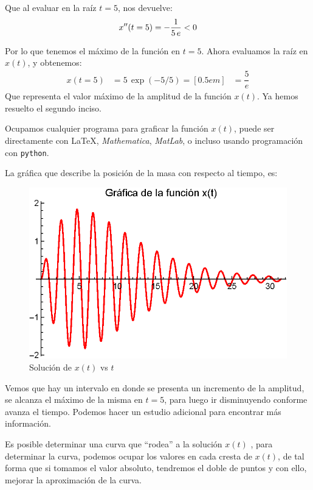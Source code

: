Que al evaluar en la raíz $t = 5$, nos devuelve: 
\begin{align*}
{x}^{\prime \prime}(t=5) = - \dfrac{1}{5 \, e} < 0
\end{align*}

Por lo que tenemos el máximo de la función en $t = 5$. Ahora evaluamos la raíz en $x(t)$, y obtenemos:
\begin{align*}
x(t=5) &= 5 \, \exp (-5/5) = [0.5em]
&= \dfrac{5}{e}
\end{align*}
Que representa el valor máximo de la amplitud de la función $x(t)$.  Ya hemos resuelto el segundo inciso.

Ocupamos cualquier programa para graficar la función $x(t)$, puede ser directamente con \LaTeX, \emph{Mathematica}, \emph{MatLab}, o incluso usando programación con \texttt{python}.

La gráfica que describe la posición de la masa con respecto al tiempo, es:
\begin{figure}
    \centering
    \includegraphics[scale=1]{Imagenes/Ejemplo_Resonancia_01.eps}
    \caption{Solución de $x(t)$ vs $t$}
\end{figure}

Vemos que hay un intervalo en donde se presenta un incremento de la amplitud, se alcanza el máximo de la misma en $t = 5$, para luego ir disminuyendo conforme avanza el tiempo. Podemos hacer un estudio adicional para encontrar más información.
\par
Es posible determinar una curva que \enquote{rodea} a la solución $x(t)$ , para determinar la curva, podemos ocupar los valores en cada cresta de $x(t)$, de tal forma que si tomamos el valor absoluto, tendremos el doble de puntos y con ello, mejorar la aproximación de la curva.

